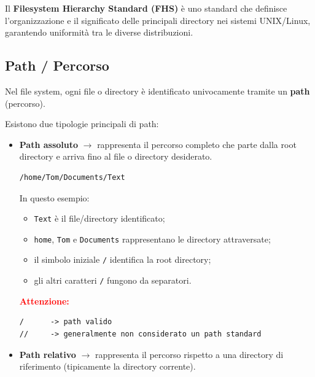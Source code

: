 \bigskip

\noindent
Il \textbf{Filesystem Hierarchy Standard (FHS)} è uno standard che definisce l’organizzazione e il significato delle principali directory nei sistemi UNIX/Linux, garantendo uniformità tra le diverse distribuzioni.

\bigskip
\subsection{Path / Percorso}

Nel file system, ogni file o directory è identificato univocamente tramite un \textbf{path} (percorso).

Esistono due tipologie principali di path:

\begin{itemize}

    \item \textbf{Path assoluto} $\rightarrow$ rappresenta il percorso completo che parte dalla root directory e arriva fino al file o directory desiderato.

\begin{verbatim}
/home/Tom/Documents/Text
\end{verbatim}

\noindent
In questo esempio:

\begin{itemize}
    \item \texttt{Text} è il file/directory identificato;
    
    \item \texttt{home}, \texttt{Tom} e \texttt{Documents} rappresentano le directory attraversate;
    
    \item il simbolo iniziale \texttt{/} identifica la root directory;
    
    \item gli altri caratteri \texttt{/} fungono da separatori.
\end{itemize}

\medskip

\noindent
\textbf{\textcolor{red}{Attenzione:}}
\begin{verbatim}
/      -> path valido
//     -> generalmente non considerato un path standard
\end{verbatim}

\bigskip

    \item \textbf{Path relativo} $\rightarrow$ rappresenta il percorso rispetto a una directory di riferimento (tipicamente la directory corrente).
    
\end{itemize}

